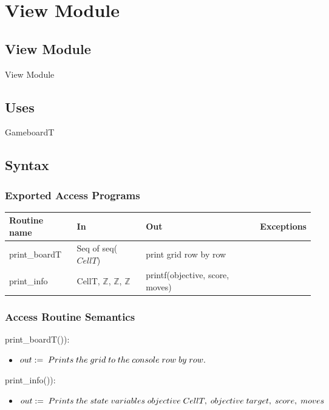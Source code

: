 \documentclass[12pt]{article}
\begin{document}
\newpage

\section* {View Module}

\subsection*{View Module}

View Module

\subsection* {Uses}

\noindent GameboardT
\subsection* {Syntax}

\subsubsection* {Exported Access Programs}

\begin{tabular}{| l | l | l | l |}
\hline
\textbf{Routine name} & \textbf{In} & \textbf{Out} & \textbf{Exceptions}\\
\hline
print\_boardT & Seq of seq($CellT$) & print grid row by row &\\
\hline
print\_info & CellT, $\mathbb{Z}$, $\mathbb{Z}$, $\mathbb{Z}$ & printf(objective, score, moves) & \\
\hline
\end{tabular}

\subsubsection* {Access Routine Semantics}

print\_boardT()):
\begin{itemize}
\item $out:= \thickspace Prints\thickspace the \thickspace grid \thickspace to \thickspace the \thickspace console \thickspace row \thickspace by \thickspace row. $
\end{itemize}

print\_info()):
\begin{itemize}
\item $out:= \thickspace Prints \thickspace the \thickspace state \thickspace variables \thickspace objective \thickspace CellT, \thickspace objective \thickspace target, \thickspace score, \thickspace moves $
\end{itemize}
\end{document}
